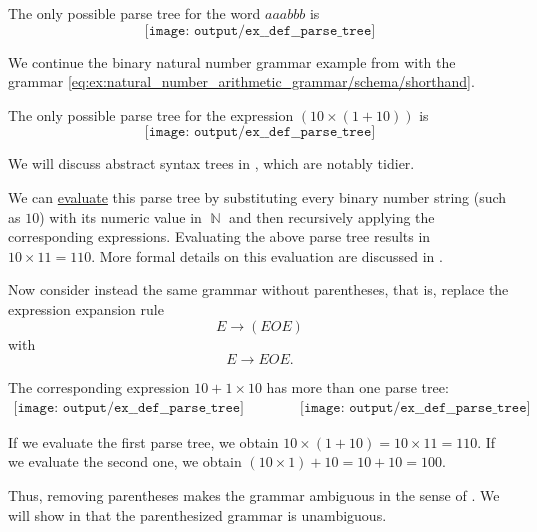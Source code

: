\begin{example}
\begin{thmenum}
    The only possible parse tree for the word \( aaabbb \) is
    \begin{equation*}
      \texttt{[image: output/ex\_\_def\_\_parse\_tree]}
    \end{equation*}

     We continue the binary natural number grammar example from  with the grammar \eqref{eq:ex:natural_number_arithmetic_grammar/schema/shorthand}.

    The only possible parse tree for the expression \( (10 \times (1 + 10)) \) is
    \begin{equation*}
      \texttt{[image: output/ex\_\_def\_\_parse\_tree]}
    \end{equation*}

    We will discuss abstract syntax trees in , which are notably tidier.

    We can \hyperref[rem:evaluation]{evaluate} this parse tree by substituting every binary number string (such as \( 10 \)) with its numeric value in \( \BbbN \) and then recursively applying the corresponding expressions. Evaluating the above parse tree results in \( 10 \times 11 = 110 \). More formal details on this evaluation are discussed in .

    Now consider instead the same grammar without parentheses, that is, replace the expression expansion rule
    \begin{equation*}
      E \to (E O E)
    \end{equation*}
    with
    \begin{equation*}
      E \to E O E.
    \end{equation*}

    The corresponding expression \( 10 + 1 \times 10 \) has more than one parse tree:
    \begin{equation*}
      \begin{aligned}
        \texttt{[image: output/ex\_\_def\_\_parse\_tree]}
        \qquad\qquad
        \texttt{[image: output/ex\_\_def\_\_parse\_tree]}
      \end{aligned}
    \end{equation*}

    If we evaluate the first parse tree, we obtain \( 10 \times (1 + 10) = 10 \times 11 = 110 \). If we evaluate the second one, we obtain \( (10 \times 1) + 10 = 10 + 10 = 100 \).

    Thus, removing parentheses makes the grammar ambiguous in the sense of . We will show in  that the parenthesized grammar is unambiguous.
  \end{thmenum}
\end{example}

